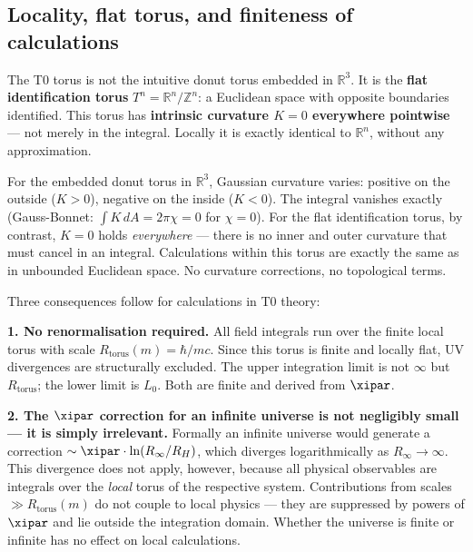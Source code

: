 \subsection{Locality, flat torus, and finiteness of calculations}

The T0 torus is not the intuitive donut torus embedded in $\mathbb{R}^3$. It is the \textbf{flat identification torus} $T^n = \mathbb{R}^n / \mathbb{Z}^n$: a Euclidean space with opposite boundaries identified. This torus has \textbf{intrinsic curvature $K = 0$ everywhere pointwise} — not merely in the integral. Locally it is exactly identical to $\mathbb{R}^n$, without any approximation.

\begin{keypoint}
For the embedded donut torus in $\mathbb{R}^3$, Gaussian curvature varies: positive on the outside ($K > 0$), negative on the inside ($K < 0$). The integral vanishes exactly (Gauss-Bonnet: $\int K\,dA = 2\pi\chi = 0$ for $\chi = 0$). For the flat identification torus, by contrast, $K = 0$ holds \emph{everywhere} — there is no inner and outer curvature that must cancel in an integral. Calculations within this torus are exactly the same as in unbounded Euclidean space. No curvature corrections, no topological terms.
\end{keypoint}

Three consequences follow for calculations in T0 theory:

\textbf{1. No renormalisation required.} All field integrals run over the finite local torus with scale $R_\text{torus}(m) = \hbar/mc$. Since this torus is finite and locally flat, UV divergences are structurally excluded. The upper integration limit is not $\infty$ but $R_\text{torus}$; the lower limit is $L_0$. Both are finite and derived from $\xipar$.

\textbf{2. The $\xipar$ correction for an infinite universe is not negligibly small — it is simply irrelevant.} Formally an infinite universe would generate a correction $\sim \xipar \cdot \ln(R_\infty / R_H)$, which diverges logarithmically as $R_\infty \to \infty$. This divergence does not apply, however, because all physical observables are integrals over the \emph{local} torus of the respective system. Contributions from scales $\gg R_\text{torus}(m)$ do not couple to local physics — they are suppressed by powers of $\xipar$ and lie outside the integration domain. Whether the universe is finite or infinite has no effect on local calculations.

